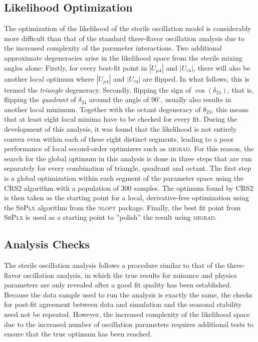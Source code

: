 \subsection{Likelihood Optimization}
The optimization of the likelihood of the sterile oscillation model is considerably more difficult than that of the standard three-flavor oscillation analysis due to the increased complexity of the parameter interactions. Two additional approximate degeneracies arise in the likelihood space from the sterile mixing angles alone: Firstly, for every best-fit point in $|U_{\mu 4}|$ and $|U_{\tau 4}|$, there will also be another local optimum where $|U_{\mu 4}|$ and $|U_{\tau 4}|$ are flipped. In what follows, this is termed the \emph{triangle} degeneracy. Secondly, flipping the sign of $\cos(\delta_{24})$, that is, flipping the \emph{quadrant} of $\delta_{24}$ around the angle of $90^\circ$, usually also results in another local minimum. Together with the octant degeneracy of $\theta_{23}$, this means that at least eight local minima have to be checked for every fit. During the development of this analysis, it was found that the likelihood is not entirely convex even within each of these eight distinct segments, leading to a poor performance of local second-order optimizers such as \textsc{migrad}\cite{minuit-algo}. For this reason, the search for the global optimum in this analysis is done in three steps that are run separately for every combination of triangle, quadrant and octant. The first step is a global optimization within each segment of the parameter space using the CRS2\cite{crs2} algorithm with a population of 300 samples. The optimum found by CRS2 is then taken as the starting point for a local, derivative-free optimization using the \textsc{SbPlx}\cite{subplex} algorithm from the \textsc{nlopt}\cite{nlopt} package. Finally, the best fit point from  \textsc{SbPlx} is used as a starting point to ''polish'' the result using \textsc{migrad}\cite{minuit-algo}.

\subsection{Analysis Checks}

The sterile oscillation analysis follows a procedure similar to that of the three-flavor oscillation analysis, in which the true results for nuisance and physics parameters are only revealed after a good fit quality has been established. Because the data sample used to run the analysis is exactly the same, the checks for post-fit agreement between data and simulation and the seasonal stability need not be repeated. However, the increased complexity of the likelihood space due to the increased number of oscillation parameters requires additional tests to ensure that the true optimum has been reached.

